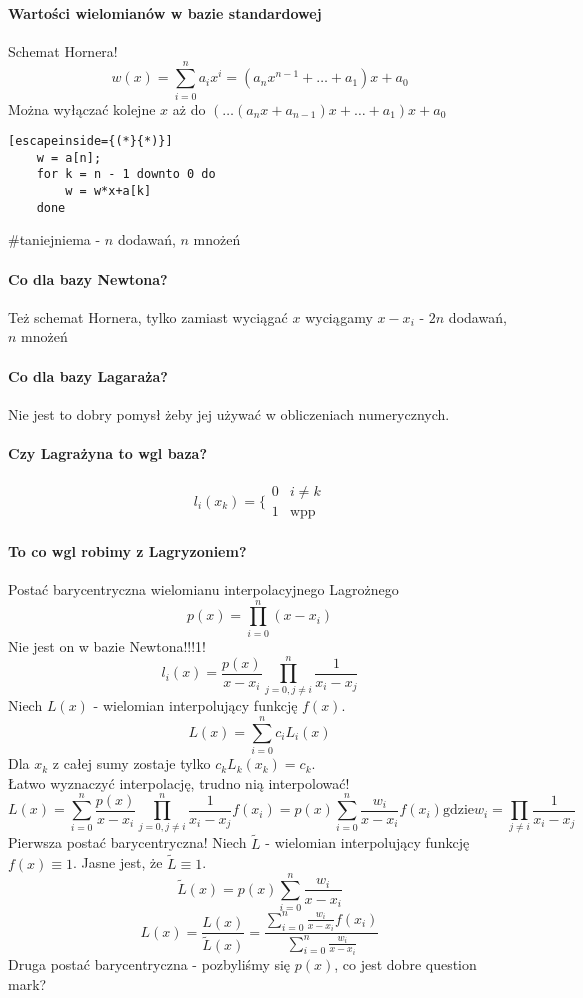 \documentclass{article}
\begin{document}
\paragraph{Wartości wielomianów w bazie standardowej}
Schemat Hornera!
$$w(x)=\sum_{i=0}^{n}a_ix^i=(a_nx^{n-1}+\dots+a_1)x+a_0$$
Można wyłączać kolejne $ x $ aż do $ (\dots(a_nx+a_{n-1})x + \dots + a_1)x + a_0 $
\begin{lstlisting}[escapeinside={(*}{*)}]
	w = a[n];
	for k = n - 1 downto 0 do
		w = w*x+a[k]
	done
\end{lstlisting}
\#taniejniema - $ n $ dodawań, $ n $ mnożeń\\
\paragraph{Co dla bazy Newtona?}
Też schemat Hornera, tylko zamiast wyciągać $ x $ wyciągamy $ x-x_i $  - $ 2n $ dodawań, $ n $ mnożeń

\paragraph{Co dla bazy Lagaraża?}
	Nie jest to dobry pomysł żeby jej używać w obliczeniach numerycznych.
\paragraph{Czy Lagrażyna to wgl baza?}
$$l_i(x_k)=\bigg\{\begin{matrix}
0&i\not=k\\
1 &\text{wpp}
\end{matrix}$$
\paragraph{To co wgl robimy z Lagryzoniem?}
Postać barycentryczna wielomianu interpolacyjnego Lagrożnego
$$p(x)=\prod_{i=0}^{n}(x-x_i)$$
Nie jest on w bazie Newtona!!!1!
$$l_i(x)=\frac{p(x)}{x-x_i}\prod_{j=0, j\not=i}^n\frac1{x_i-x_j}$$
Niech $ L(x) $ - wielomian interpolujący funkcję $f(x)$.
$$L(x)=\sum_{i=0}^{n}c_iL_i(x)$$
Dla $ x_k $ z całej sumy zostaje tylko $ c_kL_k(x_k)=c_k $.\\
Łatwo wyznaczyć interpolację, trudno nią interpolować!
$$L(x)=
\sum_{i=0}^{n}\frac{p(x)}{x-x_i}\prod_{j=0,j\not=i}^n\frac1{x_i-x_j}f(x_i) = p(x)\sum_{i=0}^{n}\frac{w_i}{x-x_i}f(x_i)
\text{gdzie}
w_i=\prod_{j\not=i}\frac1{x_i-x_j}$$
Pierwsza postać barycentryczna!
Niech $\tilde{L}$ - wielomian interpolujący funkcję $ f(x)\equiv1 $. Jasne jest, że $\tilde{L}\equiv1$.
$$\tilde{L}(x)=p(x)\sum_{i=0}^{n}\frac{w_i}{x-x_i}$$
$$L(x)=\frac{L(x)}{\tilde{L}(x)}=\frac{\sum_{i=0}^{n}\frac{w_i}{x-x_i}f(x_i)}{\sum_{i=0}^{n}\frac{w_i}{x-x_i}}$$
Druga postać barycentryczna - pozbyliśmy się $ p(x) $, co jest dobre question mark?
\end{document}

